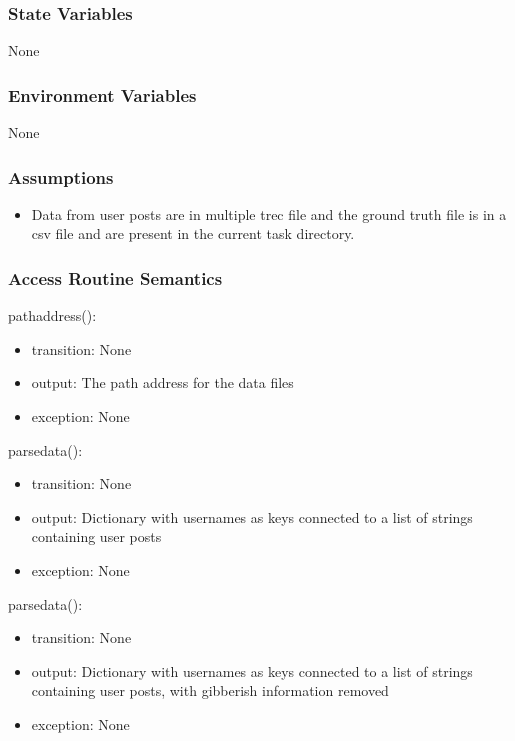 \documentclass[12pt, titlepage]{article}
\begin{document}
\subsubsection{State Variables}

None

\subsubsection{Environment Variables}

None

\subsubsection{Assumptions}

\begin{itemize}
\item Data from user posts are in multiple trec file and the ground truth file is in a csv file and are present in the current task directory.
\end{itemize}

\subsubsection{Access Routine Semantics}

\noindent pathaddress():
\begin{itemize}
\item transition: None
\item output: The path address for the data files
\item exception: None
\end{itemize}

\noindent parsedata():
\begin{itemize}
\item transition: None
\item output: Dictionary with usernames as keys connected to a list of strings containing user posts
\item exception: None
\end{itemize}

\noindent parsedata():
\begin{itemize}
\item transition: None
\item output: Dictionary with usernames as keys connected to a list of strings containing user posts, with gibberish information removed
\item exception: None
\end{itemize}
\end{document}

